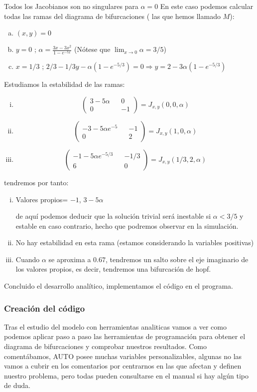 Todos los Jacobianos son no singulares para $\alpha = 0$
En este caso podemos calcular todas las ramas del diagrama de bifurcaciones ( las que hemos llamado $M$):
\begin{enumerate}[a)]
	\item $(x,y)=0$
	\item $y=0$ ;  $ \alpha=\frac{3x-3x^2}{1-e^{-5x}}
	 $ (Nótese que $ \lim_{x\rightarrow 0}\alpha=3/5$)
	\item $x=1/3$ ; $2/3-1/3y-\alpha(1-e^{-5/3})=0 \Rightarrow y=2-3\alpha(1-e^{-5/3})$
\end{enumerate}
Estudiamos la estabilidad de las ramas: 
 \begin{enumerate}[i)]
 	\item  \[ \left (\begin{matrix} 3-5\alpha && 0 \\ 0 && -1  \end{matrix}  \right )=J_{x,y}(0,0,\alpha)\]
 	\item  \[ \left (\begin{matrix} -3-5\alpha e^{-5} && -1 \\ 0 && 2  \end{matrix}  \right )=J_{x,y}(1,0,\alpha)\]
 	\item  \[ \left (\begin{matrix} -1-5\alpha e^{-5/3} && -1/3 \\ 6 && 0  \end{matrix}  \right )=J_{x,y}(1/3,2,\alpha)\]
 \end{enumerate}
tendremos por tanto:
\begin{enumerate}[i)]
	\item Valores propios= $-1$, $3-5\alpha$
	
	de aquí podemos deducir que la solución trivial será inestable si $\alpha<3/5$ y estable en caso contrario, hecho que podremos observar en  la simulación.
	\item No hay estabilidad en esta rama (estamos considerando la variables positivas)
	\item Cuando $\alpha$ se aproxima a $0.67$, tendremos un salto sobre el eje imaginario de los valores propios, es decir, tendremos una bifurcación de hopf.
\end{enumerate}
Concluido el desarrollo analítico, implementamos el código en el programa.

\subsubsection{Creación del código}
Tras el estudio del modelo con herramientas analiticas vamos a ver como podemos aplicar paso a paso las herramientas de programación para obtener el diagrama de bifurcaciones y comprobar nuestros resultados. 
Como comentábamos, AUTO posee muchas variables personalizables, algunas no las vamos a cubrir en los comentarios por centrarnos en las que afectan y definen nuestro problema, pero todas pueden consultarse en el manual \cite{auto} si hay algún tipo de duda.
 
